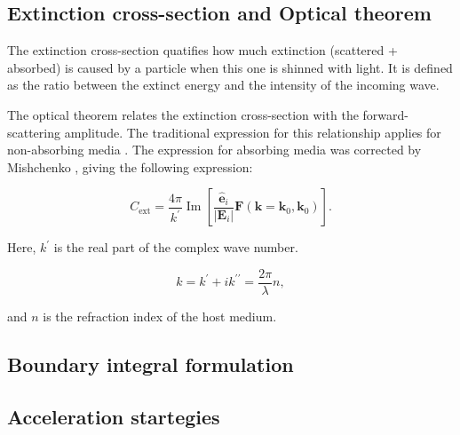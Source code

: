\subsection{Extinction cross-section and Optical theorem} \label{sec:cext_ot}

The extinction cross-section quatifies how much extinction (scattered + absorbed) 
is caused by a particle when this one is shinned with light. It is defined as the
ratio between the extinct energy and the intensity of the incoming wave. 

The optical theorem relates the extinction cross-section with the forward-scattering amplitude. The traditional expression for this relationship applies for non-absorbing media \cite{MayergoyzZhang2007, Jackson}. The expression for absorbing media \cite{BohrenGilra1979, VideenSun2003} was corrected by Mishchenko \cite{Mishchenko2007}, giving the following expression:

\begin{equation}
    C_\text{ext} = \frac{4\pi}{k^\prime} \operatorname{Im} \left[ \frac{\mathbf{\hat{e}}_i}{|\mathbf{E}_i|}\mathbf{F}(\mathbf{k}=\mathbf{k}_0, \mathbf{k}_0) \right].
\end{equation}


\color{red}{Chris in Mishenko 2007 paper the equation is not exactly the same 
(look eq 87 in paper), do you have that derivation? How you got to the eq 7.22 
 in your thesis?}

Here, $k^\prime$ is the real part of the complex wave number. 

\begin{equation}
    k = k^\prime + ik^{\prime\prime} = \frac{2\pi}{\lambda} n,
\end{equation}

and $n$ is the refraction index of the host medium.


\subsection{Boundary integral formulation} \label{sec:lspr_bem}


\subsection{Acceleration startegies} \label{sec:acc_strategies}













